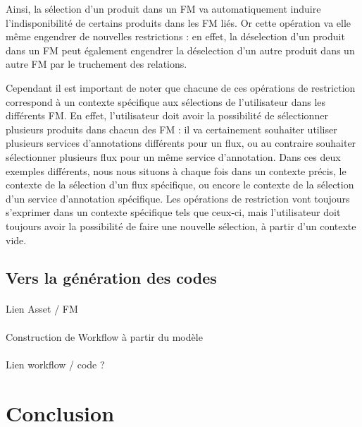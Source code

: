 \documentclass[]{easychair}
\begin{document}
Ainsi, la sélection d'un produit dans un FM va automatiquement induire l'indisponibilité de certains produits dans les FM liés. Or cette opération va elle même engendrer de nouvelles restrictions : en effet, la déselection d'un produit dans un FM peut également engendrer la déselection d'un autre produit dans un autre FM par le truchement des relations. 

Cependant il est important de noter que chacune de ces opérations de restriction correspond à un contexte spécifique aux sélections de l'utilisateur dans les différents FM. En effet, l'utilisateur doit avoir la possibilité de sélectionner plusieurs produits dans chacun des FM : il va certainement souhaiter utiliser plusieurs services d'annotations différents pour un flux, ou au contraire souhaiter sélectionner plusieurs flux pour un même service d'annotation. Dans ces deux exemples différents, nous nous situons à chaque fois dans un contexte précis, le contexte de la sélection d'un flux spécifique, ou encore le contexte de la sélection d'un service d'annotation spécifique. Les opérations de restriction vont toujours s'exprimer dans un contexte spécifique tels que ceux-ci, mais l'utilisateur doit toujours avoir la possibilité de faire une nouvelle sélection, à partir d'un contexte vide. 


\subsection{Vers la génération des codes}

\paragraph{}
Lien Asset / FM 

\paragraph{}
Construction de Workflow à partir du modèle

\paragraph{}
Lien workflow / code ?


\section{Conclusion}
\label{sect:conclusion}



%
\label{sect:bib}

%
%
%


\appendix


\end{document}
